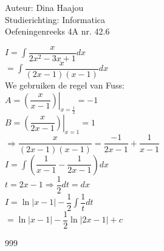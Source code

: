 \documentclass[a4paper]{article}
\newcommand{\bigint}{\displaystyle\int}
\begin{document}
   
  
\noindent \large Auteur: Dina Haajou \\
\noindent \large Studierichting: Informatica\\
\noindent \large Oefeningenreeks 4A nr. 42.6\\

\medskip

\normalsize

$I = \bigint \dfrac{x}{2x^2 - 3x + 1} dx$ \\

$= \bigint \dfrac{x}{(2x - 1)(x - 1)} dx$ \\

We gebruiken de regel van Fuss: \\

$A = \left. \left( \dfrac{x}{x - 1} \right) \right|_{x = \tfrac{1}{2}} = -1$ \\

$B = \left. \left( \dfrac{x}{2x - 1} \right) \right|_{x = 1} = 1$ \\

$\Rightarrow \dfrac{x}{(2x - 1)(x - 1)} = \dfrac{-1}{2x - 1} + \dfrac{1}{x - 1}$ \\

$I = \bigint \left( \dfrac{1}{x - 1} - \dfrac{1}{2x - 1} \right) dx$ \\

$t = 2x - 1 \Rightarrow \dfrac{1}{2} dt = dx$ \\

$I = \ln |x - 1| - \dfrac{1}{2} \bigint \dfrac{1}{t} dt$ \\

$= \ln |x - 1| - \dfrac{1}{2} \ln |2x - 1| + c$ \\

\begin{thebibliography}{999}
\end{thebibliography}  
\end{document}
